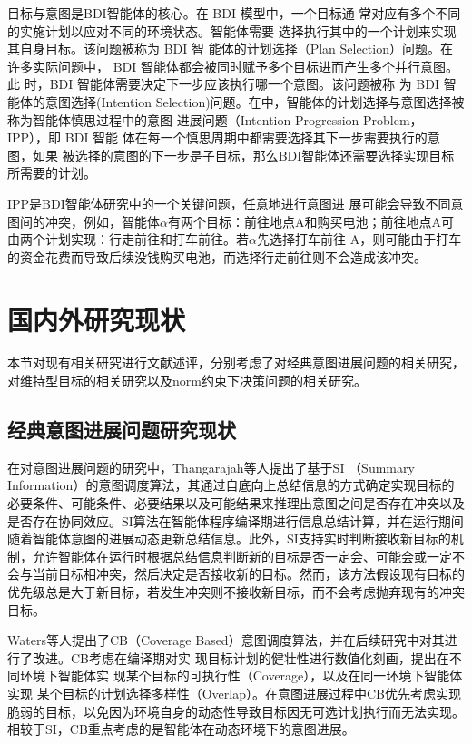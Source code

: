 目标与意图是BDI智能体的核心。在 BDI 模型中，一个目标通 常对应有多个不同的实施计划以应对不同的环境状态。智能体需要 选择执行其中的一个计划来实现其自身目标。该问题被称为 BDI 智 能体的计划选择（Plan Selection）问题\cite{yao2017robust}。在许多实际问题中， BDI 智能体都会被同时赋予多个目标进而产生多个并行意图。此 时，BDI 智能体需要决定下一步应该执行哪一个意图。该问题被称 为 BDI 智能体的意图选择(Intention Selection)问题\cite{yao2017robust}。在\cite{DBLP:conf/emas/Castle-GreenDL20}中，智能体的计划选择与意图选择被称为智能体慎思过程中的意图 进展问题（Intention Progression Problem， IPP），即 BDI 智能 体在每一个慎思周期中都需要选择其下一步需要执行的意图，如果 被选择的意图的下一步是子目标，那么BDI智能体还需要选择实现目标所需要的计划。


IPP是BDI智能体研究中的一个关键问题，任意地进行意图进 展可能会导致不同意图间的冲突，例如，智能体$\alpha$有两个目标：前往地点A和购买电池；前往地点A可由两个计划实现：行走前往和打车前往。若$\alpha$先选择打车前往 A，则可能由于打车的资金花费而导致后续没钱购买电池，而选择行走前往则不会造成该冲突。

\section{国内外研究现状}
本节对现有相关研究进行文献述评，分别考虑了对经典意图进展问题的相关研究，对维持型目标的相关研究以及norm约束下决策问题的相关研究。
\subsection{经典意图进展问题研究现状}
在对意图进展问题的研究中，Thangarajah等人\cite{DBLP:journals/jar/ThangarajahP11,DBLP:conf/ijcai/ThangarajahPW03}提出了基于SI （Summary Information）的意图调度算法，其通过自底向上总结信息的方式确定实现目标的必要条件、可能条件、必要结果以及可能结果来推理出意图之间是否存在冲突以及是否存在协同效应。SI算法在智能体程序编译期进行信息总结计算，并在运行期间随着智能体意图的进展动态更新总结信息。此外，SI支持实时判断接收新目标的机制，允许智能体在运行时根据总结信息判断新的目标是否一定会、可能会或一定不会与当前目标相冲突，然后决定是否接收新的目标。然而，该方法假设现有目标的优先级总是大于新目标，若发生冲突则不接收新目标，而不会考虑抛弃现有的冲突目标。

Waters等人\cite{DBLP:conf/atal/WatersPS14,DBLP:conf/aamas/ThangarajahSP12}提出了CB（Coverage Based）意图调度算法，并在后续研究中对其进行了改进\cite{DBLP:journals/aamas/WatersPS15}。CB考虑在编译期对实 现目标计划的健壮性进行数值化刻画，提出在不同环境下智能体实 现某个目标的可执行性（Coverage），以及在同一环境下智能体实现 某个目标的计划选择多样性（Overlap）。在意图进展过程中CB优先考虑实现脆弱的目标，以免因为环境自身的动态性导致目标因无可选计划执行而无法实现。相较于SI，CB重点考虑的是智能体在动态环境下的意图进展。

